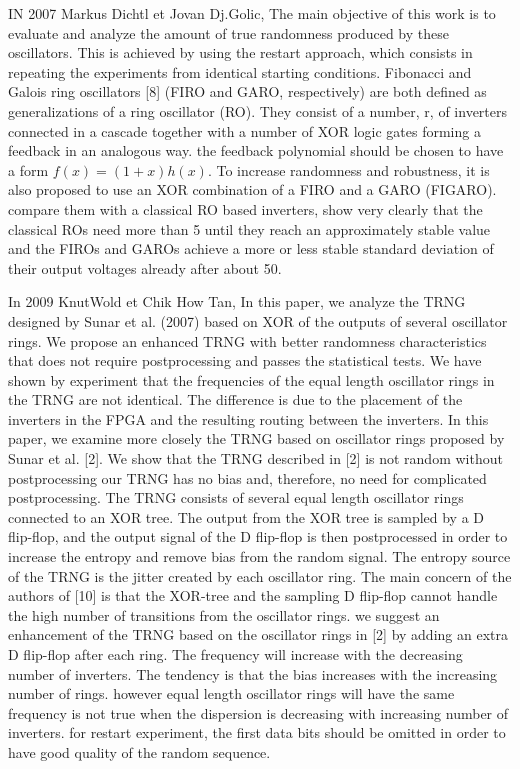 IN 2007 Markus Dichtl et Jovan Dj.Golic, The main objective of this work is to evaluate and analyze the amount of true randomness produced by these oscillators. This is achieved by using the restart approach, which consists in repeating the experiments from identical starting conditions. Fibonacci and Galois ring oscillators [8] (FIRO and GARO, respectively) are both defined as generalizations of a ring oscillator (RO). They consist of a number, r, of inverters connected in a cascade together with a number of XOR logic gates forming a feedback in an analogous way. the feedback polynomial should be chosen to have a form $f(x) = (1+x)h(x)$. To increase randomness and robustness, it is also proposed to use an
XOR combination of a FIRO and a GARO (FIGARO). compare them with a classical RO based inverters, show very clearly that the classical ROs need more than 5 until they reach an approximately stable value and the FIROs and GAROs achieve a more or less stable standard deviation of their output voltages already after about 50.

In 2009 KnutWold et Chik How Tan, In this paper, we analyze the TRNG designed by Sunar et al. (2007) based on XOR of the outputs of several oscillator rings. We propose an enhanced TRNG with better randomness characteristics that does not require postprocessing and passes the statistical tests. We have shown by experiment that the frequencies of the equal length oscillator rings in the TRNG are not identical. The difference is due to the placement of the inverters in the FPGA and the resulting routing between the inverters. In this paper, we examine more closely the TRNG based on oscillator rings proposed by Sunar et al. [2]. We show that the TRNG described in [2] is not random without postprocessing our TRNG has no bias and, therefore, no need for complicated postprocessing. The TRNG consists of several equal length oscillator rings connected to an XOR tree. The output from the XOR tree is sampled by a D flip-flop, and the output signal of the D flip-flop is then postprocessed in order to increase the entropy and remove bias from the random signal. The entropy source of the TRNG is the jitter created by each oscillator ring. The main concern of the authors of [10] is that the XOR-tree and the sampling D flip-flop cannot handle the high number of transitions from the oscillator rings. we suggest an enhancement of the TRNG based on the oscillator rings in [2] by adding an extra D flip-flop after each ring. The frequency will increase with the decreasing number of inverters. The tendency is that the bias increases with the increasing number of rings. however equal length oscillator rings will have the same frequency is not true when the dispersion is decreasing with increasing number of inverters. for restart experiment, the first data bits should be omitted in order to have good quality of the random sequence.

